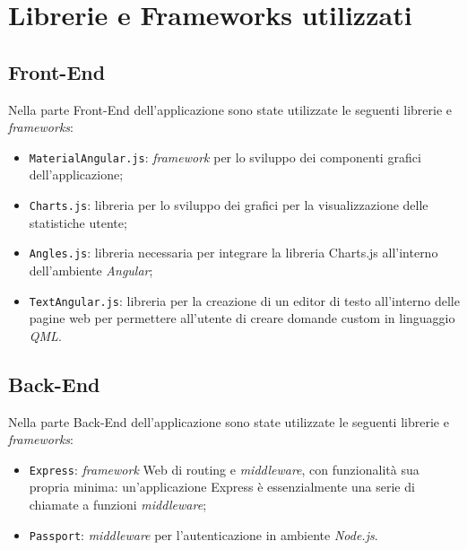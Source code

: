 \newpage
\section{Librerie e Frameworks utilizzati}
\subsection{Front-End}
Nella parte Front-End dell'applicazione sono state utilizzate le seguenti librerie e \textit{frameworks}:
\begin{itemize}
	\item \texttt{MaterialAngular.js}: \textit{framework} per lo sviluppo dei componenti grafici dell'applicazione;
	\item \texttt{Charts.js}: libreria per lo sviluppo dei grafici per la visualizzazione delle statistiche
	utente;
	\item \texttt{Angles.js}: libreria necessaria per integrare la libreria Charts.js all'interno
	dell'ambiente \textit{Angular};
	\item \texttt{TextAngular.js}: libreria per la creazione di un editor di testo all'interno delle pagine web per permettere all'utente di creare domande custom in linguaggio \textit{QML}.
\end{itemize}
\subsection{Back-End}
Nella parte Back-End dell'applicazione sono state utilizzate le seguenti librerie e \textit{frameworks}:
\begin{itemize}
	\item \texttt{Express}: \textit{framework} Web di routing e \textit{middleware}, con funzionalità sua propria minima: un'applicazione Express è essenzialmente una serie di chiamate a funzioni \textit{middleware};
	\item \texttt{Passport}: \textit{middleware} per l'autenticazione in ambiente \textit{Node.js}.
\end{itemize}

